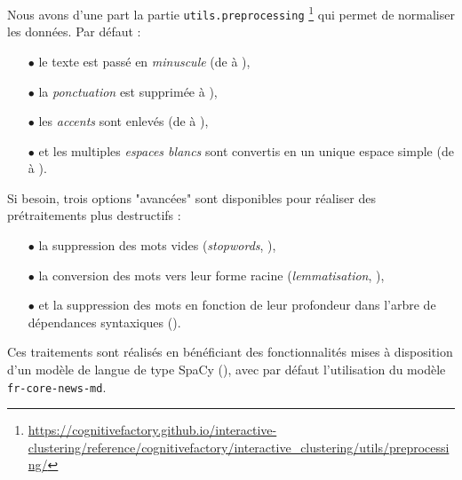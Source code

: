 	Nous avons d'une part la partie \texttt{utils.preprocessing} \footnote{
		\url{https://cognitivefactory.github.io/interactive-clustering/reference/cognitivefactory/interactive_clustering/utils/preprocessing/}
	} qui permet de normaliser les données.
	Par défaut :
	\begin{itemize}
		\item[\(\bullet\)] le texte est passé en \textit{minuscule} (de  à ),
		\item[\(\bullet\)] la \textit{ponctuation} est supprimée  à ), %
		\item[\(\bullet\)] les \textit{accents} sont enlevés (de  à ),
		\item[\(\bullet\)] et les multiples \textit{espaces blancs} sont convertis en un unique espace simple (de  à ).
	\end{itemize}
	
	Si besoin, trois options "avancées" sont disponibles pour réaliser des prétraitements plus destructifs :
	\begin{itemize}
		\item[\(\bullet\)] la suppression des mots vides (\textit{stopwords}, \cite{nothman-etal:2018:stop-word-lists}),
		\item[\(\bullet\)] la conversion des mots vers leur forme racine (\textit{lemmatisation}, \cite{manning-schutze:2000:foundations-statistical-natural}),
		\item[\(\bullet\)] et la suppression des mots en fonction de leur profondeur dans l'arbre de dépendances syntaxiques (\cite{nivre:2006:inductive-dependency-parsing}).
	\end{itemize}
	
	Ces traitements sont réalisés en bénéficiant des fonctionnalités mises à disposition d'un modèle de langue de type SpaCy (\cite{honnibal-montani:2017:spacy-natural-language}), avec par défaut l'utilisation du modèle \texttt{fr-core-news-md}.
	
